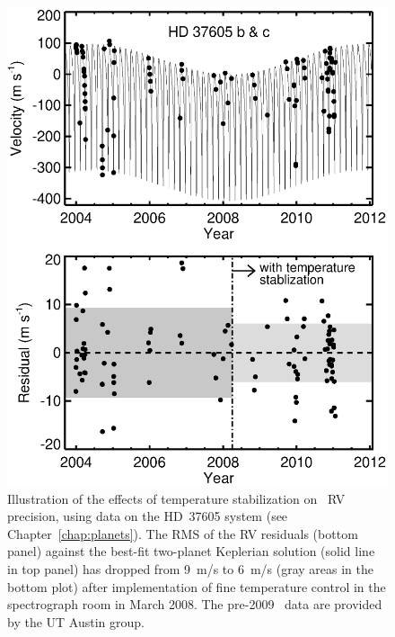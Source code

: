 \begin{figure}
\centering
\includegraphics[scale=0.5]{het/37605.eps}
\caption{Illustration of the effects of temperature stabilization on
  \het\ RV precision, using data on the HD~37605 system (see
  Chapter~\ref{chap:planets}). The RMS of the RV residuals (bottom
  panel) against the best-fit two-planet Keplerian solution (solid
  line in top panel) has dropped from 9~m/s to 6~m/s (gray areas in
  the bottom plot) after implementation of fine temperature control in
  the spectrograph room in March 2008. The pre-2009 \het\ data are
  provided by the UT Austin group.
\label{het:fig:tempstable}}
\end{figure}


